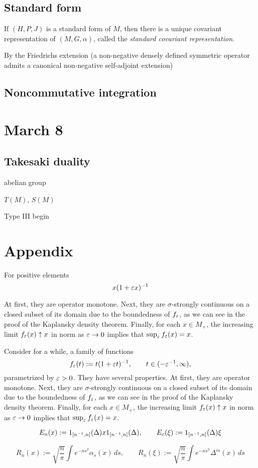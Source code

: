 \documentclass{../../small}
\begin{document}
\subsection{Standard form}

If $(H,P,J)$ is a standard form of $M$, then there is a unique covariant representation of $(M,G,\alpha)$, called the \emph{standard covariant representation}.


By the Friedrichs extension (a non-negative densely defined symmetric operator admits a canonical non-negative self-adjoint extension)



\subsection{Noncommutative integration}


\newpage
\section{March 8}


\subsection{Takesaki duality}
abelian group


$T(M)$, $S(M)$


Type III
begin

\newpage
\section*{Appendix}

\begin{prop}
For positive elements
\[x(1+\varepsilon x)^{-1}\]

At first, they are operator monotone.
Next, they are $\sigma$-strongly continuous on a closed subset of its domain due to the boundedness of $f_\varepsilon$, as we can see in the proof of the Kaplansky density theorem.
Finally, for each $x\in M_+$, the increasing limit $f_\varepsilon(x)\uparrow x$ in norm as $\varepsilon\to0$ implies that $\sup_\varepsilon f_\varepsilon(x)=x$.
\end{prop}
Consider for a while, a family of functions
\[f_\varepsilon(t):=t(1+\varepsilon t)^{-1},\qquad t\in(-\varepsilon^{-1},\infty),\]
parametrized by $\varepsilon>0$.
They have several properties.
At first, they are operator monotone.
Next, they are $\sigma$-strongly continuous on a closed subset of its domain due to the boundedness of $f_\varepsilon$, as we can see in the proof of the Kaplansky density theorem.
Finally, for each $x\in M_+$, the increasing limit $f_\varepsilon(x)\uparrow x$ in norm as $\varepsilon\to0$ implies that $\sup_\varepsilon f_\varepsilon(x)=x$.



\begin{prop}
\[E_n(x):=1_{[n^{-1},n]}(\Delta)x1_{[n^{-1},n]}(\Delta),\qquad E_\varepsilon(\xi):=1_{[n^{-1},n]}(\Delta)\xi\]
\end{prop}

\begin{prop}
\[R_n(x):=\sqrt{\frac n\pi}\int e^{-ns^2}\alpha_s(x)\,ds,\qquad R_n(\xi):=\sqrt{\frac n\pi}\int e^{-ns^2}\Delta^{is}(x)\,ds\]
\end{prop}
\end{document}
